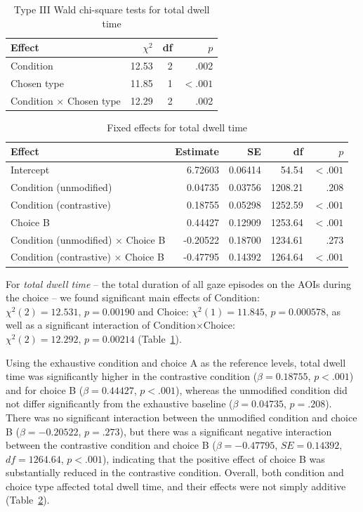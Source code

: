 \documentclass[ruler]{CUP-JNL-LIN}%
\begin{document}
\begin{table}[htbp]
\centering
\caption{Type III Wald chi-square tests for total dwell time}
\label{tab:total-dwell}
\begin{tabularx}{\textwidth}{@{}Xrrr@{}}
\toprule
Effect & $\chi^2$ & df & $p$ \\
\midrule
Condition & 12.53 & 2 & .002 \\
Chosen type & 11.85 & 1 & $< .001$ \\
Condition $\times$ Chosen type & 12.29 & 2 & .002 \\
\bottomrule
\end{tabularx}
\end{table}

\begin{table}[htbp]
\centering
\caption{Fixed effects for total dwell time}
\label{tab:total-dwell-fixed}
\begin{tabularx}{\textwidth}{@{}Xrrrr@{}}
\toprule
Effect & Estimate & SE & df & $p$ \\
\midrule
Intercept & 6.72603 & 0.06414 & 54.54 & $< .001$ \\
Condition (unmodified) & 0.04735 & 0.03756 & 1208.21 & .208 \\
Condition (contrastive) & 0.18755 & 0.05298 & 1252.59 & $< .001$ \\
Choice B & 0.44427 & 0.12909 & 1253.64 & $< .001$ \\
Condition (unmodified) $\times$ Choice B & -0.20522 & 0.18700 & 1234.61 & .273 \\
Condition (contrastive) $\times$ Choice B & -0.47795 & 0.14392 & 1264.64 & $< .001$ \\
\bottomrule
\end{tabularx}
\end{table}

For \textit{total dwell time} -- the total duration of all gaze episodes on the AOIs during the choice -- we found significant main effects of Condition: \(\chi^2(2)=12.531,\,p=0.00190\) and Choice: \(\chi^2(1)=11.845,\,p=0.000578\), as well as a significant interaction of Condition\(\times\)Choice: \(\chi^2(2)=12.292,\,p=0.00214\) (Table~\ref{tab:total-dwell}). 

Using the exhaustive condition and choice A as the reference levels, total dwell time was significantly higher in the contrastive condition ($\beta = 0.18755$, $p < .001$) and for choice B ($\beta = 0.44427$, $p < .001$), whereas the unmodified condition did not differ significantly from the exhaustive baseline ($\beta = 0.04735$, $p = .208$). There was no significant interaction between the unmodified condition and choice B ($\beta = -0.20522$, $p = .273$), but there was a significant negative interaction between the contrastive condition and choice B ($\beta = -0.47795$, $SE = 0.14392$, $df = 1264.64$, $p < .001$), indicating that the positive effect of choice B was substantially reduced in the contrastive condition. Overall, both condition and choice type affected total dwell time, and their effects were not simply additive (Table~\ref{tab:total-dwell-fixed}).
\end{document}
